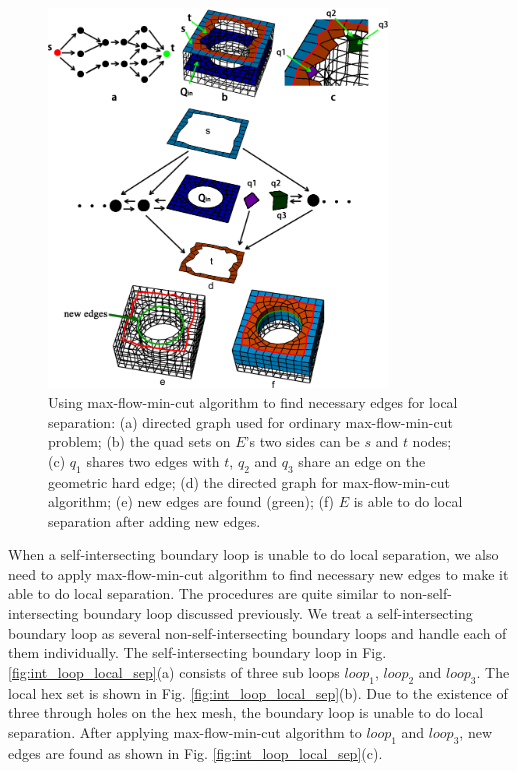 \documentclass[final,5p,times,twocolumn]{elsarticle}
\begin{document}
\begin{figure}[htbp]
\begin{center}
\includegraphics[width=9cm]{max_flow_graph.png}
\caption{Using max-flow-min-cut algorithm to find necessary edges for local separation: (a) directed graph used for ordinary max-flow-min-cut problem; (b) the quad sets on $E$'s two sides can be $s$ and $t$ nodes; (c) $q_1$ shares two edges with $t$, $q_2$ and $q_3$ share an edge on the geometric hard edge; (d) the directed graph for max-flow-min-cut algorithm; (e) new edges are found (green); (f) $E$ is able to do local separation after adding new edges.}
\label{fig:max_flow_graph}
\end{center}
\end{figure}

When a self-intersecting boundary loop is unable to do local separation, we also need to apply max-flow-min-cut algorithm to find necessary new edges to make it able to do local separation. The procedures are quite similar to non-self-intersecting boundary loop discussed previously. We treat a self-intersecting boundary loop as several non-self-intersecting boundary loops and handle each of them individually. The self-intersecting boundary loop in Fig. \ref{fig:int_loop_local_sep}(a) consists of three sub loops $loop_1$, $loop_2$ and $loop_3$. The local hex set is shown in Fig. \ref{fig:int_loop_local_sep}(b). Due to the existence of three through holes on the hex mesh, the boundary loop is unable to do local separation. After applying max-flow-min-cut algorithm to $loop_1$ and $loop_3$, new edges are found as shown in Fig. \ref{fig:int_loop_local_sep}(c).
\end{document}
